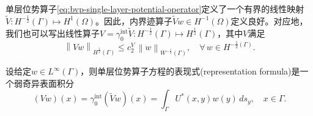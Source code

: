 单层位势算子\eqref{eq:bvp-single-layer-potential-operator}定义了一个有界的线性映射$\widetilde{V}: H^{-\frac{1}{2}}(\Gamma) \mapsto H^{1}(\Omega)$。因此，内界迹算子$\widetilde{V}w \in H^{-1}(\Omega)$定义良好。对应地，我们也可以写出线性算子$V = \gamma_{0}^{\text{int}} \widetilde{V}: H^{-\frac{1}{2}}(\Gamma) \mapsto H^{\frac{1}{2}}(\Gamma)$，其中$V$满足
\begin{equation}
  \label{eq:bvp-single-layer-operator-v-norm}
  \left\| V w \right\|_{H^{\frac{1}{2}}(\Gamma)} \le c_{2}^{V} \, \left\| w \right\|_{W^{-\frac{1}{2}}(\Gamma)}, \quad \forall \, w \in H^{-\frac{1}{2}(\Gamma)}.
\end{equation}

\begin{lemma}[单层位势算子方程的表现式]
  \label{lemma:bvp-single-layer-representation-formula}
  设给定$w \in L^{\infty}(\Gamma)$，则单层位势算子方程的表现式(representation formula)是一个弱奇异表面积分
  \begin{equation}
    \label{eq:bvp-single-layer-representation-formula}
    \left( V w \right)(x) = \gamma_{0}^{\text{int}} \left( \widetilde{V} w \right)(x) = \int_{\Gamma} U^{*}(x,y) w(y) \, d s_y, \quad x \in \Gamma.
  \end{equation}
\end{lemma}
